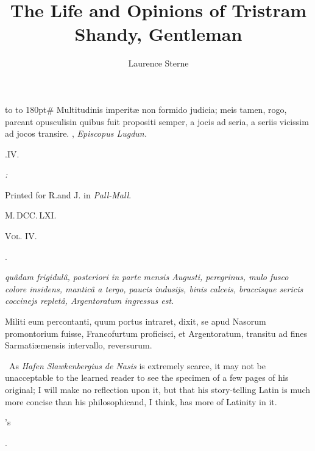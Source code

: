 \documentclass{article}
\title{The Life and Opinions of Tristram Shandy, Gentleman}
\author{Laurence Sterne}
\begin{document}
\pagestyle{empty}
\hbox{}
\vfill
\vbox{\openup 16pt\halign to }
\vfill
\newpage
\null
\newpage %
\pagestyle{empty}
\vbox{\openup 10pt}
\vfill
\vbox{\openup -2pt\halign to 180pt{\footnotesize #\cr
Multitudinis imperitæ non formido judicia; meis\cr
\quad tamen, rogo, parcant opusculis\tsh in quibus\cr
\quad fuit propositi semper, a jocis ad seria, a seriis\cr
\quad vicissim ad jocos transire.\hfill\cr
\hfill {},\cr
\hfill \textit{Episcopus Lugdun.}\cr}}
\vfill
\centerline{.\quad IV.}
\vfill
\centerline{\itshape{}:}
\centerline{\smaller Printed for R.\@ and J.\@ {} in \textit{Pall-Mall}.}
\centerline{M.\,DCC.\,LXI.}
\newpage
\null
\newpage
\null
\vfill
\noindent
\textsc{Vol. IV.}
\setcounter{page}{1}
\setlength{\baselineskip}{14pt}  %
\newpage
\centerline{\large{}}
\centerline{\large{}.}

\bgroup\itshape\def\emph#1{{\normalshape #1}}
 quâdam frigidulâ,
po\-steriori in parte mensis \emph{Augusti}, peregrinus, mulo fusco
colore insidens, manticâ a tergo, paucis indusijs, binis
calceis, braccisque sericis coccinejs repletâ, \emph{Argentoratum}
ingressus est.

Militi eum percontanti, quum portus intraret, dixit, se apud
Nasorum promontorium fuisse, Francofurtum proficisci, et
Argentoratum, transitu ad fines Sarmatiæ\break mensis intervallo,
reversurum.\egroup


\vfill
\bgroup\fontsize{8}{10}\selectfont\indent\fnast\ 
As \textit{Hafen Slawkenbergius de Nasis} is extremely scarce, it may not be
unacceptable to the learned reader to see the specimen of a few pages of his
original; I will make no reflection upon it, but that his story-telling Latin
is much more concise than his philosophic\tsk and, I think, has more of
Latinity in it.\par
\egroup
\newpage
\centerline{\large{}'s}
\centerline{\large{}.}
\end{document}
